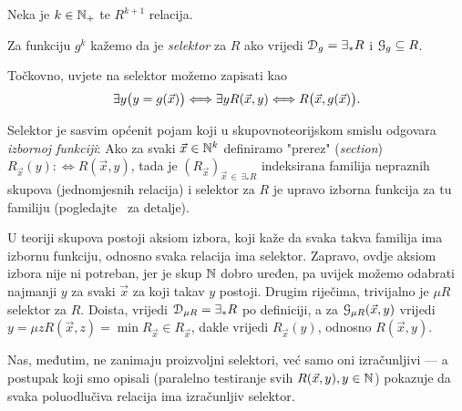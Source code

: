 \begin{definicija}[{name=[selektor]}]
Neka je $k\in{\mathbb N}_+$ te $R^{k+1}$ relacija.

Za funkciju $g^k$ kažemo da je \emph{selektor} za $R$ ako vrijedi $\mathcal D_{g}=\exists_*R$ i $\mathcal G_{g}\subseteq R$.
\end{definicija}

Točkovno, uvjete na selektor možemo zapisati kao
\begin{equation}
    \exists y\bigl(y=g(\vec x)\bigr)\Longleftrightarrow\exists yR(\vec x,y)\Longleftrightarrow R\bigl(\vec x,g(\vec x)\bigr)\text.
\end{equation}

Selektor je sasvim općenit pojam koji u skupovnoteorijskom smislu odgovara \emph{izbornoj funkciji}: Ako za svaki $\vec x\in{\mathbb N}^k$ definiramo "prerez" (\emph{section}) $R_{\vec x}(y):\Longleftrightarrow R(\vec x,y)$,
tada je $(R_{\vec x})_{\vec x\,\in\,\exists_*\!R}$ indeksirana familija nepraznih skupova (jednomjesnih relacija) i selektor za $R$ je upravo izborna funkcija za tu familiju (pogledajte~\cite[str.\ 92]{skr:VukTS} za detalje).

U teoriji skupova postoji aksiom izbora, koji kaže da svaka takva familija ima izbornu funkciju, odnosno svaka relacija ima selektor. Zapravo, ovdje aksiom izbora nije ni potreban, jer je skup ${\mathbb N}$ dobro uređen, pa uvijek možemo odabrati najmanji $y$ za svaki $\vec x$ za koji takav $y$ postoji. Drugim riječima, trivijalno je $\mu R$ selektor za $R$. Doista, vrijedi $\mathcal D_{\mu R}=\exists_*R$ po definiciji, a za $\mathcal G_{\mu R}(\vec x,y)$ vrijedi $y=\mu z R(\vec x,z)=\min R_{\vec x}\in R_{\vec x}$, dakle vrijedi $R_{\vec x}(y)$, odnosno $R(\vec x,y)$.

Nas, međutim, ne zanimaju proizvoljni selektori, već samo oni izračunljivi --- a postupak koji smo opisali (paralelno testiranje svih $R(\vec x,y),y\in{\mathbb N}$) pokazuje da svaka poluodlučiva relacija ima izračunljiv selektor.

